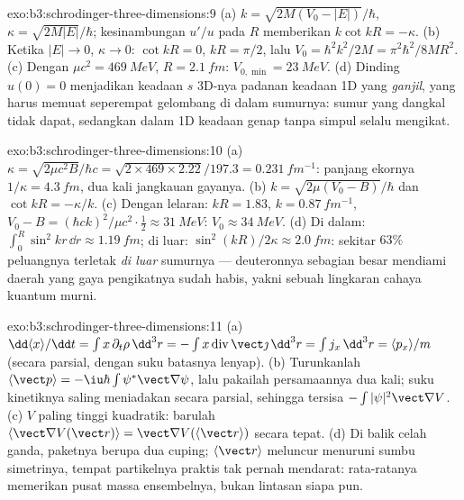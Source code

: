 \begin{solution}{exo:b3:schrodinger-three-dimensions:9}
(a) $k = \sqrt{2M(V_0 - |E|)}/\hbar$, $\kappa = \sqrt{2M|E|}/\hbar$;
kesinambungan $u'/u$ pada $R$ memberikan $k\cot kR = -\kappa$. (b) Ketika $|E|
\to 0$, $\kappa \to 0$: $\cot kR = 0$, $kR = \pi/2$, lalu $V_0 =
\hbar^2k^2/2M = \pi^2\hbar^2/8MR^2$. (c) Dengan $\mu c^2 =
\qty{469}{MeV}$, $R = \qty{2.1}{fm}$: $V_{0,\min} = \qty{23}{MeV}$.
(d) Dinding $u(0) = 0$ menjadikan keadaan $s$ 3D-nya padanan keadaan 1D
yang \emph{ganjil}, yang harus memuat seperempat gelombang di dalam
sumurnya: sumur yang dangkal tidak dapat, sedangkan dalam 1D keadaan
genap tanpa simpul selalu mengikat.
\end{solution}

\begin{solution}{exo:b3:schrodinger-three-dimensions:10}
(a) $\kappa = \sqrt{2\mu c^2B}/\hbar c = \sqrt{2 \times 469 \times
2.22}/197.3 = \qty{0.231}{fm^{-1}}$: panjang ekornya $1/\kappa =
\qty{4.3}{fm}$, dua kali jangkauan gayanya. (b) $k =
\sqrt{2\mu(V_0 - B)}/\hbar$ dan $\cot kR = -\kappa/k$. (c) Dengan lelaran:
$kR = 1.83$, $k = \qty{0.87}{fm^{-1}}$, $V_0 - B = (\hbar ck)^2/\mu
c^2\cdot\tfrac12 \approx \qty{31}{MeV}$: $V_0 \approx \qty{34}{MeV}$.
(d) Di dalam: $\int_0^R\sin^2kr\,\dd r \approx \qty{1.19}{fm}$;
di luar: $\sin^2(kR)/2\kappa \approx \qty{2.0}{fm}$: sekitar $63\%$
peluangnya terletak \emph{di luar} sumurnya --- deuteronnya sebagian
besar mendiami daerah yang gaya pengikatnya sudah habis, yakni sebuah
lingkaran cahaya kuantum murni.
\end{solution}

\begin{solution}{exo:b3:schrodinger-three-dimensions:11}
(a) $\dd\langle x\rangle/\dd t = \int x\,\partial_t\rho\,\dd^3r =
-\int x\operatorname{div}\vect\jmath\,\dd^3r = \int j_x\,\dd^3r =
\langle p_x\rangle/m$ (secara parsial, dengan suku batasnya lenyap). (b)
Turunkanlah $\langle\vect p\rangle = -\iu\hbar\int\psi^*\vect\nabla
\psi$, lalu pakailah persamaannya dua kali; suku kinetiknya saling
meniadakan secara parsial, sehingga tersisa $-\int|\psi|^2\vect\nabla V$. (c) $V$ paling
tinggi kuadratik: barulah $\langle\vect\nabla V(\vect r)\rangle = \vect\nabla V(\langle
\vect r\rangle)$ secara tepat. (d) Di balik celah ganda, paketnya berupa
dua cuping; $\langle\vect r\rangle$ meluncur menuruni sumbu simetrinya,
tempat partikelnya praktis tak pernah mendarat: rata-ratanya memerikan
pusat massa ensembelnya, bukan lintasan siapa pun.
\end{solution}

